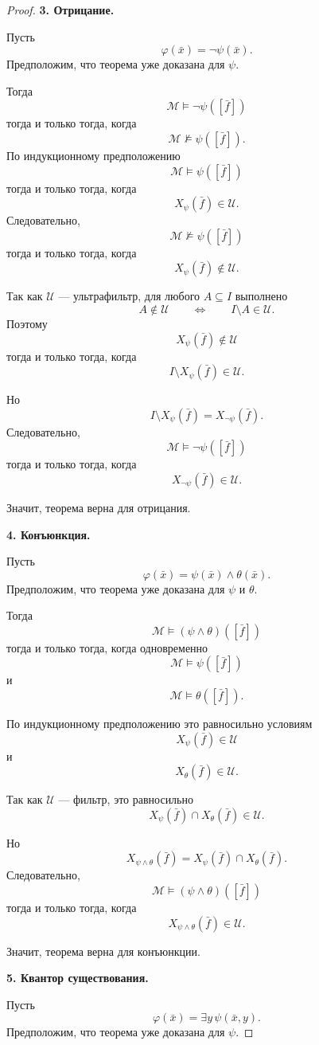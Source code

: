 \documentclass[12pt,a4paper,oneside,openany]{book}
\theoremstyle{definition}
\theoremstyle{plain}
\theoremstyle{remark}
\begin{document}
\begin{proof}
\medskip

\textbf{3. Отрицание.}

Пусть
\[
\varphi(\bar x)=\neg\psi(\bar x).
\]
Предположим, что теорема уже доказана для $\psi$.

Тогда
\[
\mathcal M\models\neg\psi([\bar f])
\]
тогда и только тогда, когда
\[
\mathcal M\not\models\psi([\bar f]).
\]
По индукционному предположению
\[
\mathcal M\models\psi([\bar f])
\]
тогда и только тогда, когда
\[
X_\psi(\bar f)\in\mathcal U.
\]
Следовательно,
\[
\mathcal M\not\models\psi([\bar f])
\]
тогда и только тогда, когда
\[
X_\psi(\bar f)\notin\mathcal U.
\]

Так как $\mathcal U$ — ультрафильтр, для любого $A\subseteq I$ выполнено
\[
A\notin\mathcal U
\qquad
\Longleftrightarrow
\qquad
I\setminus A\in\mathcal U.
\]
Поэтому
\[
X_\psi(\bar f)\notin\mathcal U
\]
тогда и только тогда, когда
\[
I\setminus X_\psi(\bar f)\in\mathcal U.
\]

Но
\[
I\setminus X_\psi(\bar f)=X_{\neg\psi}(\bar f).
\]
Следовательно,
\[
\mathcal M\models\neg\psi([\bar f])
\]
тогда и только тогда, когда
\[
X_{\neg\psi}(\bar f)\in\mathcal U.
\]

Значит, теорема верна для отрицания.

\medskip

\textbf{4. Конъюнкция.}

Пусть
\[
\varphi(\bar x)=\psi(\bar x)\wedge\theta(\bar x).
\]
Предположим, что теорема уже доказана для $\psi$ и $\theta$.

Тогда
\[
\mathcal M\models(\psi\wedge\theta)([\bar f])
\]
тогда и только тогда, когда одновременно
\[
\mathcal M\models\psi([\bar f])
\]
и
\[
\mathcal M\models\theta([\bar f]).
\]

По индукционному предположению это равносильно условиям
\[
X_\psi(\bar f)\in\mathcal U
\]
и
\[
X_\theta(\bar f)\in\mathcal U.
\]

Так как $\mathcal U$ — фильтр, это равносильно
\[
X_\psi(\bar f)\cap X_\theta(\bar f)\in\mathcal U.
\]

Но
\[
X_{\psi\wedge\theta}(\bar f)
=
X_\psi(\bar f)\cap X_\theta(\bar f).
\]
Следовательно,
\[
\mathcal M\models(\psi\wedge\theta)([\bar f])
\]
тогда и только тогда, когда
\[
X_{\psi\wedge\theta}(\bar f)\in\mathcal U.
\]

Значит, теорема верна для конъюнкции.

\medskip

\textbf{5. Квантор существования.}

Пусть
\[
\varphi(\bar x)=\exists y\,\psi(\bar x,y).
\]
Предположим, что теорема уже доказана для $\psi$.


\end{proof}
\end{document}
